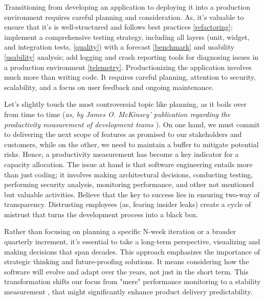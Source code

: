 

Transitioning from developing an application to deploying it into a production environment requires careful planning 
and consideration. As, it's valuable to ensure that it's is well-structured and follows best practices 
\ref{refactoring}; implement a comprehensive testing strategy, including all layers (unit, widget, and integration 
tests, \ref{quality}) with a forecast \ref{benchmark} and usability \ref{usability} analysis; add logging and crash 
reporting tools for diagnosing issues in a production environment \ref{telemetry}. Productionizing the application 
involves much more than writing code. It requires careful planning, attention to security, scalability, and a focus 
on user feedback and ongoing maintenance. 

Let's slightly touch the most controversial topic like planning, as it boils over from time to time (\emph{as, by James 
O. McKinsey' publication regarding the productivity measurement of development teams \cite{McKi23}}). On one hand, we 
must commit to delivering the next scope of features as promised to our stakeholders and customers, while on the other, 
we need to maintain a buffer to mitigate potential risks. Hence, a productivity measurement has become a key indicator 
for a capacity allocation. The issue at hand is that software engineering entails more than just coding; it involves 
making architectural decisions, conducting testing, performing security analysis, monitoring performance, and other 
not mentioned but valuable activities. Believe that the key to success lies in ensuring two-way of transparency. 
Distrusting employees (as, fearing insider leaks) create a cycle of mistrust that turns the development process into a 
black box. 

Rather than focusing on planning a specific N-week iteration or a broader quarterly increment, it's essential to take a 
long-term perspective, visualizing and making decisions that span decades. This approach emphasizes the importance of 
strategic thinking and future-proofing solutions. It means considering how the software will evolve and adapt over the 
years, not just in the short term. This transformation shifts our focus from "mere" performance monitoring to a 
stability measurement \cite{Heal23}, that might significantly enhance product delivery predictability.
